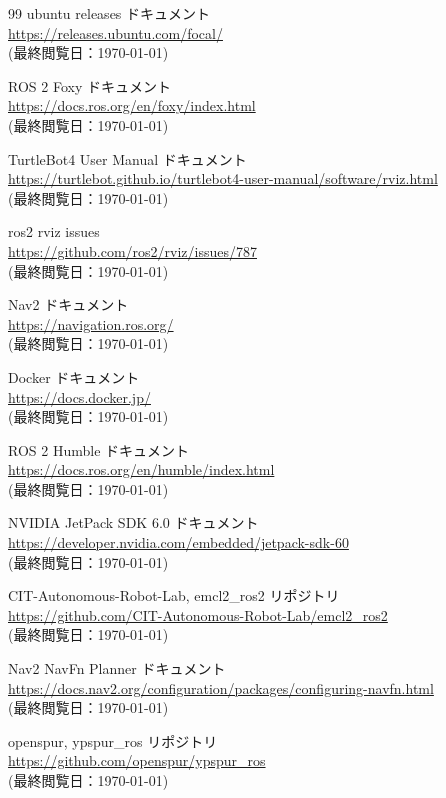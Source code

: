 \documentclass[twocolumn, 9pt]{jsproceedings}
\begin{document}
\begin{thebibliography}{99}
ubuntu releases ドキュメント\\
\url{https://releases.ubuntu.com/focal/}\\
(最終閲覧日：\today)

ROS 2 Foxy ドキュメント\\
\url{https://docs.ros.org/en/foxy/index.html}\\
(最終閲覧日：\today)

TurtleBot4 User Manual ドキュメント\\
\url{https://turtlebot.github.io/turtlebot4-user-manual/software/rviz.html}\\
(最終閲覧日：\today)

ros2 rviz issues\\
\url{https://github.com/ros2/rviz/issues/787}\\
(最終閲覧日：\today)

Nav2 ドキュメント\\
\url{https://navigation.ros.org/}\\
(最終閲覧日：\today)

Docker ドキュメント\\
\url{https://docs.docker.jp/}\\
(最終閲覧日：\today)

ROS 2 Humble ドキュメント\\
\url{https://docs.ros.org/en/humble/index.html}\\
(最終閲覧日：\today)

NVIDIA JetPack SDK 6.0 ドキュメント\\
\url{https://developer.nvidia.com/embedded/jetpack-sdk-60}\\
(最終閲覧日：\today)

CIT-Autonomous-Robot-Lab, emcl2\_ros2 リポジトリ\\
\url{https://github.com/CIT-Autonomous-Robot-Lab/emcl2_ros2}\\
(最終閲覧日：\today)

Nav2 NavFn Planner ドキュメント\\
\url{https://docs.nav2.org/configuration/packages/configuring-navfn.html}\\
(最終閲覧日：\today)

openspur, ypspur\_ros リポジトリ\\
\url{https://github.com/openspur/ypspur_ros}\\
(最終閲覧日：\today)


\end{thebibliography}
\end{document}
